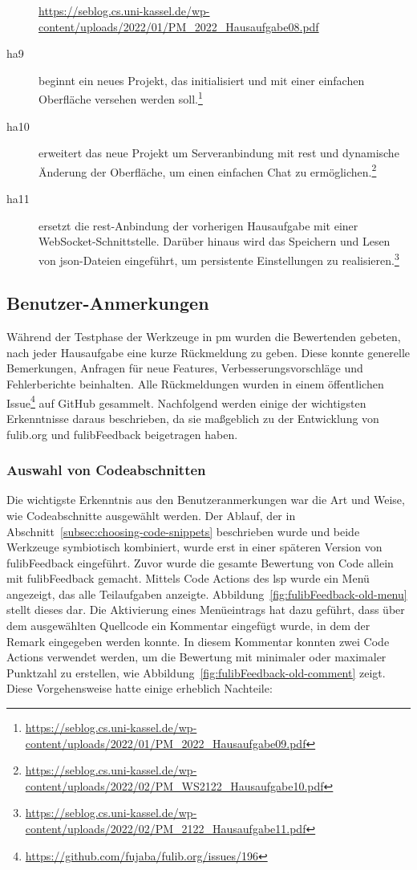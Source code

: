 \begin{description}
{        \url{https://seblog.cs.uni-kassel.de/wp-content/uploads/2022/01/PM_2022_Hausaufgabe08.pdf}
    }
    \item[\ac{ha}9] beginnt ein neues Projekt, das initialisiert und mit einer einfachen Oberfläche versehen werden soll.\footnote{
        \url{https://seblog.cs.uni-kassel.de/wp-content/uploads/2022/01/PM_2022_Hausaufgabe09.pdf}
    }
    \item[\ac{ha}10] erweitert das neue Projekt um Serveranbindung mit \ac{rest} und dynamische Änderung der Oberfläche, um einen einfachen Chat zu ermöglichen.\footnote{
        \url{https://seblog.cs.uni-kassel.de/wp-content/uploads/2022/02/PM_WS2122_Hausaufgabe10.pdf}
    }
    \item[\ac{ha}11] ersetzt die \ac{rest}-Anbindung der vorherigen Hausaufgabe mit einer WebSocket-Schnittstelle.
    Darüber hinaus wird das Speichern und Lesen von \ac{json}-Dateien eingeführt, um persistente Einstellungen zu realisieren.\footnote{
        \url{https://seblog.cs.uni-kassel.de/wp-content/uploads/2022/02/PM_2122_Hausaufgabe11.pdf}
    }
\end{description}

\subsection{Benutzer-Anmerkungen}\label{subsec:user-feedback}

Während der Testphase der Werkzeuge in \ac{pm} wurden die Bewertenden gebeten, nach jeder Hausaufgabe eine kurze Rückmeldung zu geben.
Diese konnte generelle Bemerkungen, Anfragen für neue Features, Verbesserungsvorschläge und Fehlerberichte beinhalten.
Alle Rückmeldungen wurden in einem öffentlichen Issue\footnote{
    \url{https://github.com/fujaba/fulib.org/issues/196}
} auf GitHub gesammelt.
Nachfolgend werden einige der wichtigsten Erkenntnisse daraus beschrieben, da sie maßgeblich zu der Entwicklung von fulib.org und fulibFeedback beigetragen haben.

\subsubsection{Auswahl von Codeabschnitten}

Die wichtigste Erkenntnis aus den Benutzeranmerkungen war die Art und Weise, wie Codeabschnitte ausgewählt werden.
Der Ablauf, der in Abschnitt~\ref{subsec:choosing-code-snippets} beschrieben wurde und beide Werkzeuge symbiotisch kombiniert, wurde erst in einer späteren Version von fulibFeedback eingeführt.
Zuvor wurde die gesamte Bewertung von Code allein mit fulibFeedback gemacht.
Mittels Code Actions des \ac{lsp} wurde ein Menü angezeigt, das alle Teilaufgaben anzeigte.
Abbildung~\ref{fig:fulibFeedback-old-menu} stellt dieses dar.
Die Aktivierung eines Menüeintrags hat dazu geführt, dass über dem ausgewählten Quellcode ein Kommentar eingefügt wurde, in dem der Remark eingegeben werden konnte.
In diesem Kommentar konnten zwei Code Actions verwendet werden, um die Bewertung mit minimaler oder maximaler Punktzahl zu erstellen, wie Abbildung~\ref{fig:fulibFeedback-old-comment} zeigt.
Diese Vorgehensweise hatte einige erheblich Nachteile:

